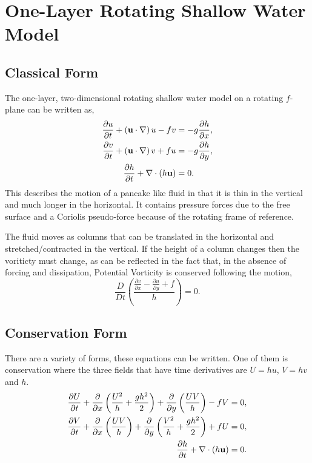 \documentclass[11pt]{article}
\begin{document}


\section*{One-Layer Rotating Shallow Water Model}

\subsection*{Classical Form}

The one-layer, two-dimensional rotating shallow water model
on a rotating $f$-plane can be written as,
\begin{align} 
\frac{\partial u}{\partial t} + \left(\bf{u} \cdot \nabla\right) u - f v 
&= - g \frac{\partial h}{\partial x},\\
\frac{\partial v}{\partial t} + \left(\bf{u} \cdot \nabla\right) v + f u 
&= - g \frac{\partial h}{\partial y},\\
\frac{\partial h}{\partial t} + \nabla \cdot \left( h \bf{u} \right) &= 0.
\end{align}
This describes the motion of a pancake like fluid in that it is thin in the vertical
and much longer in the horizontal.  It contains pressure forces due to the free surface
and a Coriolis pseudo-force because of the rotating frame of reference.

The fluid moves as columns that can be
translated in the horizontal and stretched/contracted in the vertical.  If the 
height of a column changes then the voriticty must change, as can be reflected 
in the fact that, in the absence of forcing and dissipation, 
Potential Vorticity is conserved following the motion,
$$
\frac{D}{Dt} \left( 
\frac{ \frac{\partial v}{\partial x} - \frac{\partial u}{\partial y} + f }{h} \right) = 0.
$$

\subsection*{Conservation Form}

There are a variety of forms, these equations can be written.  
One of them is conservation where the three fields that have time 
derivatives are $U = hu$, $V = hv$ and $h$.  
\begin{align} 
\frac{\partial U}{\partial t} 
+ \frac{\partial}{\partial x}\left( \frac{U^2}{h} + \frac{g h^2}{2} \right)
+ \frac{\partial}{\partial y}\left( \frac{U V}{h}  \right) 
- f V 
&= 0,\\
\frac{\partial V}{\partial t} 
+ \frac{\partial}{\partial x}\left( \frac{U V}{h}  \right) 
+ \frac{\partial}{\partial y}\left( \frac{V^2}{h} + \frac{g h^2}{2} \right)
+ f U 
&= 0,\\
\frac{\partial h}{\partial t} + \nabla \cdot \left( h \bf{u} \right) &= 0.
\end{align}
\end{document}
